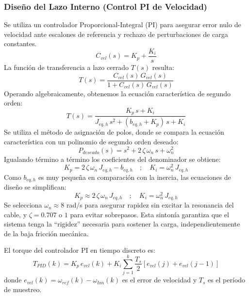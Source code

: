 \documentclass[11pt]{article}                                    %
\begin{document}
\subsubsection{Diseño del Lazo Interno (Control PI de Velocidad)}
Se utiliza un controlador Proporcional-Integral (PI) para asegurar error nulo de velocidad ante escalones de referencia y rechazo de perturbaciones de carga constantes.
\begin{equation}
    C_{vel}(s) = K_p + \frac{K_i}{s}
\end{equation}
La función de transferencia a lazo cerrado $T(s)$ resulta:
\begin{equation}
    T(s) = \frac{C_{vel}(s) \, G_{vel}(s)}{1 + C_{vel}(s) \, G_{vel}(s)}
\end{equation}
Operando algebraicamente, obtenemos la ecuación característica de segundo orden:
\begin{equation}
    T(s) = \frac{K_p \, s + K_i}{J_{eq,h} \, s^2 + (b_{eq,h} + K_p) \, s + K_i}
\end{equation}
Se utiliza el método de asignación de polos, donde se compara la ecuación característica con un polinomio de segundo orden deseado:
\begin{equation}
    P_{deseado}(s) = s^2 + 2 \, \zeta \, \omega_n \, s + \omega_n^2
\end{equation}
Igualando término a término los coeficientes del denominador se obtiene:
\begin{equation}
    K_p = 2 \, \zeta \, \omega_n \, J_{eq,h} - b_{eq,h} \quad ; \quad K_i = \omega_n^2 \, J_{eq,h}
\end{equation}
Como $b_{eq,h}$ es muy pequeña en comparación con la inercia, las ecuaciones de diseño se simplifican:
\begin{equation} \label{eq:gains_hoist}
    K_p \approx 2 \, \zeta \, \omega_n \, J_{eq,h} \quad ; \quad K_i = \omega_n^2 \, J_{eq,h}
\end{equation}
Se selecciona $\omega_n \approx 8$ rad/s para asegurar rapidez sin excitar la resonancia del cable, y $\zeta = 0.707$ o $1$ para evitar sobrepasos. Esta sintonía garantiza que el sistema tenga la ``rigidez'' necesaria para sostener la carga, independientemente de la baja fricción mecánica.

El torque del controlador PI en tiempo discreto es:
\begin{equation}
    T_{PID}(k) = K_p \, e_{vel}(k) + K_i \sum_{j=1}^{k} \frac{T_s}{2} \left[ e_{vel}(j) + e_{vel}(j-1) \right]
\end{equation}
donde $e_{vel}(k) = \omega_{ref}(k) - \omega_{hm}(k)$ es el error de velocidad y $T_s$ es el período de muestreo.
\end{document}
